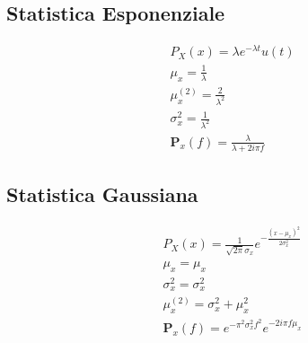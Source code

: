 \documentclass{article}
\begin{document}
\subsection*{Statistica Esponenziale}
\begin{gather*}
    P_X(x)=\lambda e^{-\lambda t}u(t)\\
    \mu_x=\displaystyle\frac{1}{\lambda}\\
    \mu_x^{(2)}=\displaystyle\frac{2}{\lambda^2}\\
    \sigma_x^2=\displaystyle\frac{1}{\lambda^2}\\
    \mathbf{P}_x(f)=\displaystyle\frac{\lambda}{\lambda+2i\pi f}
\end{gather*}
\subsection*{Statistica Gaussiana}
\begin{gather*}
    P_X(x)=\displaystyle\frac{1}{\sqrt{2\pi}\sigma_x}e^{-\frac{(x-\mu_x)^2}{2\sigma_x^2}}\\
    \mu_x=\mu_x\\
    \sigma_x^2=\sigma_x^2\\
    \mu_x^{(2)}=\sigma_x^2+\mu_x^2\\
    \mathbf{P}_x(f)=e^{-\pi^2\sigma^2_xf^2}e^{-2i\pi f\mu_x}
\end{gather*}
\end{document}
